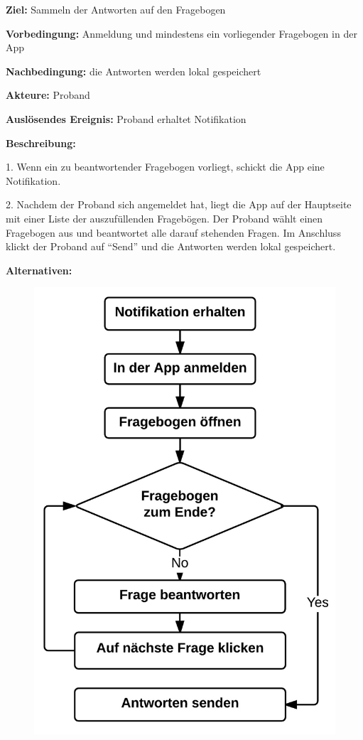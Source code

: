 \documentclass[a4paper]{scrreprt}
\begin{document}
\begin{itemize}
                    \par \textbf{Ziel: }Sammeln der Antworten auf den Fragebogen
                    \par \textbf{Vorbedingung: }Anmeldung und mindestens ein vorliegender Fragebogen in der App
                    \par \textbf{Nachbedingung: }die Antworten werden lokal gespeichert
                    \par \textbf{Akteure: }\gls{Proband}
                    \par \textbf{Auslösendes Ereignis: }\gls{Proband} erhaltet Notifikation
                    \par \textbf{Beschreibung: }
                    \par 1. Wenn ein zu beantwortender Fragebogen vorliegt, schickt die App eine Notifikation.
                    \par 2. Nachdem der \gls{Proband} sich angemeldet hat, liegt die App auf der Hauptseite mit einer Liste der auszufüllenden Fragebögen. Der \gls{Proband} wählt einen Fragebogen aus und beantwortet alle darauf stehenden Fragen. Im Anschluss klickt der \gls{Proband} auf ``Send'' und die Antworten werden lokal gespeichert.
                    \par \textbf{Alternativen: }
                    \begin{figure}[ht]
                        \centering
                        \includegraphics[scale=0.5]{AppAntworten.jpeg}

\end{figure}
\end{itemize}
\end{document}
